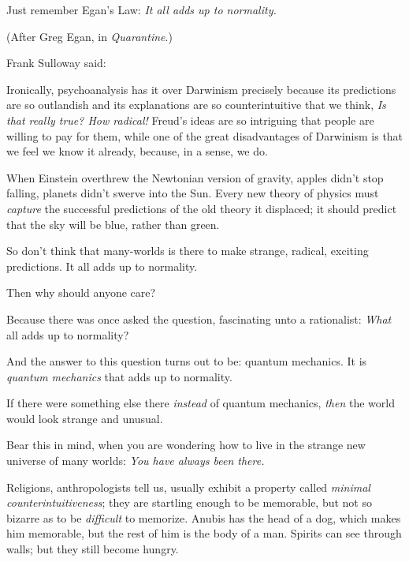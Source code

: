 {
 Just remember Egan's Law: \textit{It all adds up
to normality.}}

{
 (After Greg Egan, in \textit{Quarantine}.)}

{
 Frank Sulloway said:}

{
 Ironically, psychoanalysis has it over Darwinism precisely because
its predictions are so outlandish and its explanations are so
counterintuitive that we think, \textit{Is that really true? How
radical!} Freud's ideas are so intriguing that people
are willing to pay for them, while one of the great disadvantages of
Darwinism is that we feel we know it already, because, in a sense, we
do.}

{
 When Einstein overthrew the Newtonian version of gravity, apples
didn't stop falling, planets didn't
swerve into the Sun. Every new theory of physics must \textit{capture}
the successful predictions of the old theory it displaced; it should
predict that the sky will be blue, rather than green.}

{
 So don't think that many-worlds is there to make
strange, radical, exciting predictions. It all adds up to normality.}

{
 Then why should anyone care?}

{
 Because there was once asked the question, fascinating unto a
rationalist: \textit{What} all adds up to normality?}

{
 And the answer to this question turns out to be: quantum
mechanics. It is \textit{quantum mechanics} that adds up to normality.}

{
 If there were something else there \textit{instead} of quantum
mechanics, \textit{then} the world would look strange and unusual.}

{
 Bear this in mind, when you are wondering how to live in the
strange new universe of many worlds: \textit{You have always been
there.}}

{
 Religions, anthropologists tell us, usually exhibit a property
called \textit{minimal counterintuitiveness}; they are startling enough
to be memorable, but not so bizarre as to be \textit{difficult} to
memorize. Anubis has the head of a dog, which makes him memorable, but
the rest of him is the body of a man. Spirits can see through walls;
but they still become hungry.}

